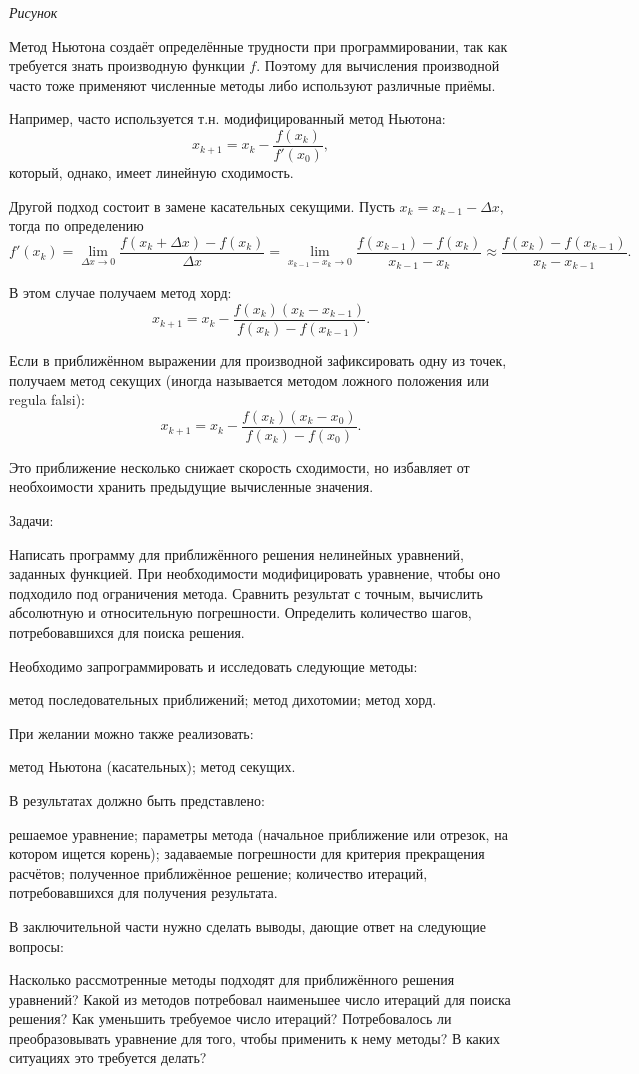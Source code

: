 \emph{Рисунок}

Метод Ньютона создаёт определённые трудности при программировании,
так как требуется знать производную функции $f$. Поэтому для вычисления
производной часто тоже применяют численные методы либо используют
различные приёмы.

Например, часто используется т.н. модифицированный метод Ньютона:
\[
x_{k+1}=x_{k}-\frac{f(x_{k})}{f'(x_{0})},
\]
который, однако, имеет линейную сходимость.

Другой подход состоит в замене касательных секущими. Пусть
$x_{k}=x_{k-1}-\Delta x,$ тогда по определению
\[
f'(x_{k})=\lim_{\Delta x\rightarrow0}\frac{f(x_{k}+\Delta x)-f(x_{k})}{\Delta x}=\lim_{x_{k-1}-x_{k}\rightarrow0}\frac{f(x_{k-1})-f(x_{k})}{x_{k-1}-x_{k}}\approx\frac{f(x_{k})-f(x_{k-1})}{x_{k}-x_{k-1}}.
\]


В этом случае получаем метод хорд:
\[
x_{k+1}=x_{k}-\frac{f(x_{k})(x_{k}-x_{k-1})}{f(x_{k})-f(x_{k-1})}.
\]


Если в приближённом выражении для производной зафиксировать одну из
точек, получаем метод секущих (иногда называется методом ложного положения
или regula falsi):
\[
x_{k+1}=x_{k}-\frac{f(x_{k})(x_{k}-x_{0})}{f(x_{k})-f(x_{0})}.
\]


Это приближение несколько снижает скорость сходимости, но избавляет от
необхоимости хранить предыдущие вычисленные значения.


\Practice

\Tasks
Задачи:

Написать программу для приближённого решения нелинейных уравнений,
заданных функцией. При необходимости модифицировать уравнение, чтобы
оно подходило под ограничения метода. Сравнить результат с точным,
вычислить абсолютную и относительную погрешности. Определить количество
шагов, потребовавшихся для поиска решения.

Необходимо запрограммировать и исследовать следующие методы:

метод последовательных приближений; метод дихотомии; метод хорд.

При желании можно также реализовать:

метод Ньютона (касательных); метод секущих.

В результатах должно быть представлено:

решаемое уравнение; параметры метода (начальное приближение или отрезок,
на котором ищется корень); задаваемые погрешности для критерия прекращения
расчётов; полученное приближённое решение; количество итераций, потребовавшихся
для получения результата.

В заключительной части нужно сделать выводы, дающие ответ на следующие
вопросы:

Насколько рассмотренные методы подходят для приближённого решения
уравнений? Какой из методов потребовал наименьшее число итераций для
поиска решения? Как уменьшить требуемое число итераций? Потребовалось
ли преобразовывать уравнение для того, чтобы применить к нему методы?
В каких ситуациях это требуется делать?

\Questions
